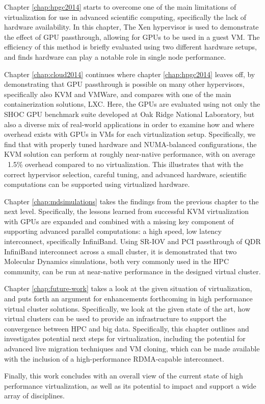 Chapter \ref{chap:hpgc2014} starts to overcome one of the main limitations of virtualization for use in advanced scientific computing, specifically the lack of hardware availability. In this chapter, The Xen hypervisor is used to demonstrate the effect of GPU passthrough, allowing for GPUs to be used in a guest VM. The efficiency of this method is briefly evaluated using two different hardware setups, and finds hardware can play a notable role in single node performance. 

Chapter \ref{chap:cloud2014} continues where chapter \ref{chap:hpgc2014} leaves off, by demonstrating that GPU passthrough is possible on many other hypervisors, specifically also KVM and VMWare, and compares with one of the main containerization solutions, LXC. Here, the GPUs are evaluated using not only the SHOC GPU benchmark suite developed at Oak Ridge National Laboratory, but also a diverse mix of real-world applications in order to examine how and where overhead exists with GPUs in VMs for each virtualization setup.  Specifically, we find that with properly tuned hardware and NUMA-balanced configurations, the KVM solution can perform at roughly near-native performance, with on average ~1.5\% overhead compared to no virtualization. This illustrates that with the correct hypervisor selection, careful tuning, and advanced hardware, scientific computations can be supported using virtualized hardware. 

Chapter \ref{chap:mdsimulations} takes the findings from the previous chapter to the next level. Specifically, the lessons learned from successful KVM virtualization with GPUs are expanded and combined with a missing key component of supporting advanced parallel computations: a high speed, low latency interconnect, specifically InfiniBand. Using SR-IOV and PCI passthrough of QDR InfiniBand interconnect across a small cluster, it is demonstrated that two Molecular Dynamics simulations, both very commonly used in the HPC community, can be run at near-native performance in the designed virtual cluster.

Chapter \ref{chap:future-work} takes a look at the given situation of virtualization, and puts forth an argument for enhancements forthcoming in high performance virtual cluster solutions. Specifically, we look at the given state of the art, how virtual clusters can be used to provide an infrastructure to support the convergence between HPC and big data. Specifically, this chapter outlines and investigates potential next steps for virtualization, including the potential for advanced live migration techniques and VM cloning, which can be made available with the inclusion of a high-performance RDMA-capable interconnect. 

Finally, this work concludes with an overall view of the current state of high performance virtualization, as well as its potential to impact and support a wide array of disciplines. 



